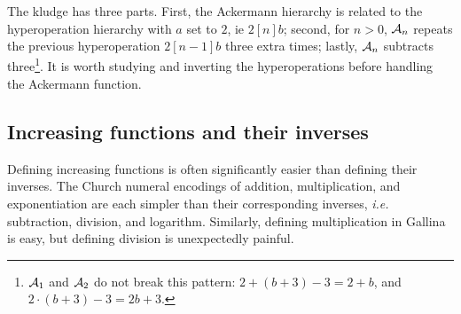 {\color{red} The kludge has three parts. First, the Ackermann hierarchy is related
to the hyperoperation hierarchy with $a$ set to $2$, ie $2[n]b$;
second, for $n>0$, $\mathcal{A}_n$ repeats the previous hyperoperation $2[n-1]b$
three extra times;
lastly, $\mathcal{A}_n$ subtracts three\footnote{$\mathcal{A}_{1}$ and $\mathcal{A}_{2}$ do not break this pattern: $2 + (b + 3) - 3 = 2 + b$, and $2 \cdot (b + 3) - 3 = 2b + 3$.}.
It is worth studying and inverting the hyperoperations before handling the Ackermann function.
}





\subsection{Increasing functions and their inverses}
\label{sec:incfuncinv}
Defining increasing functions is often significantly easier than defining their inverses.
The Church numeral encodings of addition, multiplication, and exponentiation
are each simpler than their corresponding inverses, \emph{i.e.} subtraction, division, and logarithm. Similarly, defining multiplication in Gallina~\cite{coq} is easy, but defining division is unexpectedly painful.\\[5pt]

